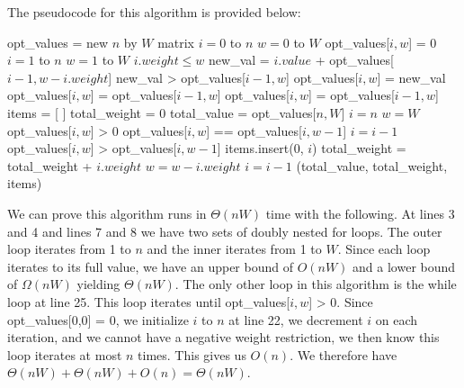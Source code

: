 \documentclass[11pt]{article}
\begin{document}
The pseudocode for this algorithm is provided below:

\begin{codebox}
\li opt\_values = new $n$ by $W$ matrix
\li
\li \For $i = 0$ to $n$ \Do
\li     \For $w = 0$ to $W$ \Do
\li         opt\_values[$i,w$] = 0
        \End
\li \End
\li \For $i=1$ to $n$ \Do
\li     \For $w=1$ to $W$ \Do
\li         \If $i.weight \leq w$ \Then
\li             new\_val = $i.value$ + opt\_values[$i-1, w - i.weight$]
\li             \If new\_val > opt\_values[$i-1, w$] \Then
\li                 opt\_values[$i,w$] = new\_val
\li             \Else
\li                 opt\_values[$i,w$] = opt\_values[$i-1, w$]
                \End
\li         \Else
\li             opt\_values[$i,w$] = opt\_values[$i-1, w$]
            \End
        \End
\li \End
\li {}
\li items = [ ]
\li total\_weight = 0
\li total\_value = opt\_values[$n,W$]
\li $i = n$
\li $w = W$
\li
\li \While opt\_values[$i,w$] > 0 \Do
\li     {}
\li     \If opt\_values[$i,w$] == opt\_values[$i,w-1$] \Then
\li         $i = i - 1$
\li
\li     \hspace{-9mm}
\li     \hspace{-9mm}
\li     \ElseIf opt\_values[$i,w$] > opt\_values[$i,w-1$] \Then
\li         items.insert(0, $i$)
\li         total\_weight = total\_weight + $i.weight$
\li         $w = w - i.weight$
\li         $i = i - 1$
        \End
\li \End
\li \Return (total\_value, total\_weight, items)
\end{codebox}

We can prove this algorithm runs in $\Theta(nW)$ time with the following. At lines 3 and 4 and lines 7 and 8 we have two sets of doubly nested for loops. The outer loop iterates from 1 to $n$ and the inner iterates from 1 to $W$. Since each loop iterates to its full value, we have an upper bound of $O(nW)$ and a lower bound of $\Omega(nW)$ yielding $\Theta(nW)$. The only other loop in this algorithm is the while loop at line 25. This loop iterates until opt\_values[$i,w$] > 0. Since opt\_values[0,0] = 0, we initialize $i$ to $n$ at line 22, we decrement $i$ on each iteration, and we cannot have a negative weight restriction, we then know this loop iterates at most $n$ times. This gives us $O(n)$. We therefore have $\Theta(nW) + \Theta(nW) + O(n) = \Theta(nW)$.
\end{document}
